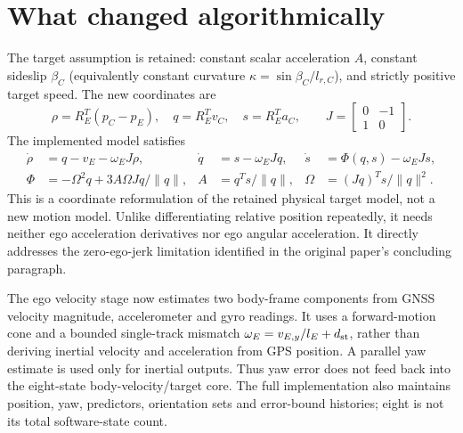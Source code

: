 \documentclass[11pt]{article}
\begin{document}
\section{What changed algorithmically}
The target assumption is retained: constant scalar acceleration $A$, constant
sideslip $\beta_C$ (equivalently constant curvature
$\kappa=\sin\beta_C/l_{r,C}$), and strictly positive target speed.
The new coordinates are
\[
 \rho=R_E^T(p_C-p_E),\quad q=R_E^T v_C,\quad s=R_E^T a_C,\qquad
 J=\begin{bmatrix}0&-1\\1&0\end{bmatrix}.
\]
The implemented model satisfies
\begin{align*}
 \dot\rho&=q-v_E-\omega_EJ\rho, &
 \dot q&=s-\omega_EJq, &
 \dot s&=\Phi(q,s)-\omega_EJs,\\
 \Phi&=-\Omega^2q+3A\Omega Jq/\|q\|, &
 A&=q^Ts/\|q\|, &
 \Omega&=(Jq)^Ts/\|q\|^2.
\end{align*}
This is a coordinate reformulation of the retained physical target model,
not a new motion model. Unlike differentiating relative position repeatedly,
it needs neither ego acceleration derivatives nor ego angular acceleration.
It directly addresses the zero-ego-jerk limitation identified in the original
paper's concluding paragraph.

The ego velocity stage now estimates two body-frame components from GNSS
velocity magnitude, accelerometer and gyro readings. It uses a forward-motion
cone and a bounded single-track mismatch
$\omega_E=v_{E,y}/l_E+d_{\rm st}$, rather than deriving inertial velocity
and acceleration from GPS position. A parallel yaw estimate is used only
for inertial outputs. Thus yaw error does not feed back into the eight-state
body-velocity/target core. The full implementation also maintains position,
yaw, predictors, orientation sets and error-bound histories; eight is not
its total software-state count.
\end{document}
